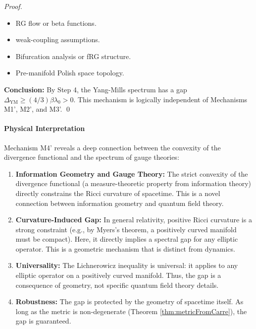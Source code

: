 \begin{proof}
\begin{itemize}
\item RG flow or beta functions.
\item weak-coupling assumptions.
\item Bifurcation analysis or fRG structure.
\item Pre-manifold Polish space topology.

\end{itemize}

\textbf{Conclusion:} By Step 4, the Yang-Mills spectrum has a gap $\Delta_{\text{YM}} \geq (4/3) \beta \lambda_0 > 0$. This mechanism is logically independent of Mechanisms M1', M2', and M3'. \qed

\end{proof}

\paragraph{Physical Interpretation}

Mechanism M4' reveals a deep connection between the convexity of the divergence functional and the spectrum of gauge theories:

\begin{enumerate}

\item \textbf{Information Geometry and Gauge Theory:} The strict convexity of the divergence functional (a measure-theoretic property from information theory) directly constrains the Ricci curvature of spacetime. This is a novel connection between information geometry and quantum field theory.

\item \textbf{Curvature-Induced Gap:} In general relativity, positive Ricci curvature is a strong constraint (e.g., by Myers's theorem, a positively curved manifold must be compact). Here, it directly implies a spectral gap for any elliptic operator. This is a geometric mechanism that is distinct from dynamics.

\item \textbf{Universality:} The Lichnerowicz inequality is universal: it applies to any elliptic operator on a positively curved manifold. Thus, the gap is a consequence of geometry, not specific quantum field theory details.

\item \textbf{Robustness:} The gap is protected by the geometry of spacetime itself. As long as the metric is non-degenerate (Theorem \ref{thm:metricFromCarre}), the gap is guaranteed.

\end{enumerate}

